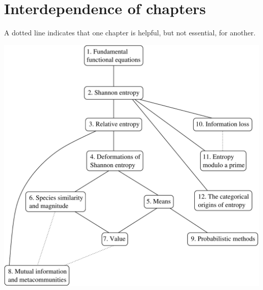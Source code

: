 \chapter*{Interdependence of chapters}

A dotted line indicates that one chapter is helpful, but not essential, for
another. 

\vskip-1in
\begin{center}
\includegraphics[width=1\textwidth]{dependency5}%
\end{center}
